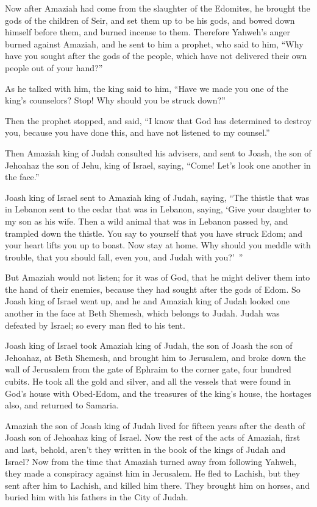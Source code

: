 {\par }{\PP {}Now after Amaziah had come from the slaughter of the Edomites, he brought the gods of the children of Seir, and set them up to be his gods, and bowed down himself before them, and burned incense to them.
Therefore Yahweh’s anger burned against Amaziah, and he sent to him a prophet, who said to him, “Why have you sought after the gods of the people, which have not delivered their own people out of your hand?”
\par }{\PP {}As he talked with him, the king said to him, “Have we made you one of the king’s counselors? Stop! Why should you be struck down?”
\par }{\PP Then the prophet stopped, and said, “I know that God has determined to destroy you, because you have done this, and have not listened to my counsel.”
\par }{\PP {}Then Amaziah king of Judah consulted his advisers, and sent to Joash, the son of Jehoahaz the son of Jehu, king of Israel, saying, “Come! Let’s look one another in the face.”
\par }{\PP {}Joash king of Israel sent to Amaziah king of Judah, saying, “The thistle that was in Lebanon sent to the cedar that was in Lebanon, saying, ‘Give your daughter to my son as his wife. Then a wild animal that was in Lebanon passed by, and trampled down the thistle.
You say to yourself that you have struck Edom; and your heart lifts you up to boast. Now stay at home. Why should you meddle with trouble, that you should fall, even you, and Judah with you?’ ”
\par }{\PP {}But Amaziah would not listen; for it was of God, that he might deliver them into the hand of their enemies, because they had sought after the gods of Edom.
So Joash king of Israel went up, and he and Amaziah king of Judah looked one another in the face at Beth Shemesh, which belongs to Judah.
Judah was defeated by Israel; so every man fled to his tent.
\par }{\PP {}Joash king of Israel took Amaziah king of Judah, the son of Joash the son of Jehoahaz, at Beth Shemesh, and brought him to Jerusalem, and broke down the wall of Jerusalem from the gate of Ephraim to the corner gate, four hundred cubits.
He took all the gold and silver, and all the vessels that were found in God’s house with Obed-Edom, and the treasures of the king’s house, the hostages also, and returned to Samaria.
\par }{\PP {}Amaziah the son of Joash king of Judah lived for fifteen years after the death of Joash son of Jehoahaz king of Israel.
Now the rest of the acts of Amaziah, first and last, behold, aren’t they written in the book of the kings of Judah and Israel?
Now from the time that Amaziah turned away from following Yahweh, they made a conspiracy against him in Jerusalem. He fled to Lachish, but they sent after him to Lachish, and killed him there.
They brought him on horses, and buried him with his fathers in the City of Judah.

}

